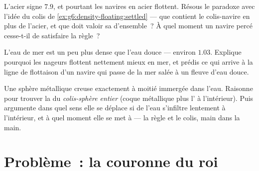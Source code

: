 \begin{exercise}[$\star\star$]\label{exo:g6:density-floating:10}
L'acier signe $7.9$, et pourtant les navires en acier flottent.
Résous le paradoxe avec l'idée du colis de
\cref{ex:g6:density-floating:settled} --- que contient le
colis-navire en plus de l'acier, et que doit valoir sa  d'ensemble~? À quel moment un navire percé cesse-t-il de
satisfaire la règle~?
\end{exercise}

\begin{exercise}[$\star\star$]\label{exo:g6:density-floating:11}
L'eau de mer est un peu plus dense que l'eau douce --- environ
$1.03$. Explique pourquoi les nageurs flottent nettement mieux en
mer, et prédis ce qui arrive à la ligne de flottaison d'un navire
qui passe de la mer salée à un fleuve d'eau douce.
\end{exercise}

\begin{exercise}[$\star\star\star$]\label{exo:g6:density-floating:12}
Une sphère métallique creuse  exactement à moitié immergée dans
l'eau. Raisonne pour trouver la  du \emph{colis-sphère
entier} (coque métallique plus l' à l'intérieur). Puis argumente
dans quel sens elle se déplace si de l'eau s'infiltre lentement à
l'intérieur, et à quel moment elle se met à  --- la règle et le
colis, main dans la main.
\end{exercise}

\section{Problème~: la couronne du roi}

